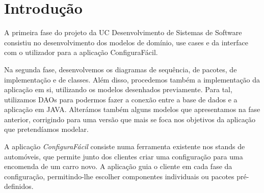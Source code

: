 \section{Introdução}
A primeira fase do projeto da UC Desenvolvimento de Sistemas de Software consistiu no desenvolvimento dos modelos de domínio, use cases e da interface com o utilizador para a aplicação ConfiguraFácil. 

Na segunda fase, desenvolvemos os diagramas de sequência, de pacotes, de implementação e de classes. Além disso, procedemos também a implementação da aplicação em si, utilizando os modelos desenhados previamente. Para tal, utilizamos DAOs para podermos fazer a conexão entre a base de dados e a aplicação em JAVA. Alterámos também alguns modelos que apresentamos na fase anterior, corrigindo para uma versão que mais se foca nos objetivos da aplicação que pretendíamos modelar.

A aplicação \textit{ConfiguraFácil} consiste numa ferramenta existente nos stands de automóveis, que permite junto dos clientes criar uma configuração para uma encomenda de um carro novo. A aplicação guia o cliente em cada fase da configuração, permitindo-lhe escolher componentes individuais ou pacotes pré-definidos. 


